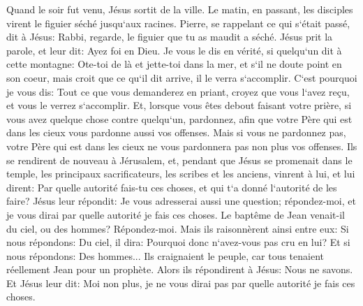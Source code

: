 \verse Quand le soir fut venu, Jésus sortit de la ville. 
\verse Le matin, en passant, les disciples virent le figuier séché jusqu`aux racines. 
\verse Pierre, se rappelant ce qui s`était passé, dit à Jésus: Rabbi, regarde, le figuier que tu as maudit a séché. 
\verse Jésus prit la parole, et leur dit: Ayez foi en Dieu. 
\verse Je vous le dis en vérité, si quelqu`un dit à cette montagne: Ote-toi de là et jette-toi dans la mer, et s`il ne doute point en son coeur, mais croit que ce qu`il dit arrive, il le verra s`accomplir. 
\verse C`est pourquoi je vous dis: Tout ce que vous demanderez en priant, croyez que vous l`avez reçu, et vous le verrez s`accomplir. 
\verse Et, lorsque vous êtes debout faisant votre prière, si vous avez quelque chose contre quelqu`un, pardonnez, afin que votre Père qui est dans les cieux vous pardonne aussi vos offenses. 
\verse Mais si vous ne pardonnez pas, votre Père qui est dans les cieux ne vous pardonnera pas non plus vos offenses. 
\verse Ils se rendirent de nouveau à Jérusalem, et, pendant que Jésus se promenait dans le temple, les principaux sacrificateurs, les scribes et les anciens, vinrent à lui, 
\verse et lui dirent: Par quelle autorité fais-tu ces choses, et qui t`a donné l`autorité de les faire? 
\verse Jésus leur répondit: Je vous adresserai aussi une question; répondez-moi, et je vous dirai par quelle autorité je fais ces choses. 
\verse Le baptême de Jean venait-il du ciel, ou des hommes? Répondez-moi. 
\verse Mais ils raisonnèrent ainsi entre eux: Si nous répondons: Du ciel, il dira: Pourquoi donc n`avez-vous pas cru en lui? 
\verse Et si nous répondons: Des hommes... Ils craignaient le peuple, car tous tenaient réellement Jean pour un prophète. 
\verse Alors ils répondirent à Jésus: Nous ne savons. Et Jésus leur dit: Moi non plus, je ne vous dirai pas par quelle autorité je fais ces choses. 

